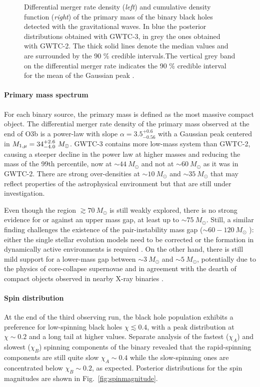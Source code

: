 \documentclass[a4paper,titlepage]{book}     	%
\newcommand{\sun}{\ensuremath{_\odot}}
\newcommand{\msun}{\ensuremath{M\sun}}
\begin{document}
\begin{figure}
\begin{minipage}{.39\textwidth}
	\end{minipage}
	\caption{Differential merger rate density  (\emph{left}) and cumulative density function (\emph{right}) of the primary mass of the binary black holes detected with the gravitational waves. In blue the posterior distributions obtained with GWTC-3, in grey the ones obtained with GWTC-2. The thick solid lines denote the median values and are surrounded by the 90 \% credible intervals.The vertical grey band on the differential merger rate indicates the 90 \% credible interval for the mean of the Gaussian peak \cite{GWTC-3_interpretation}.}\label{fig:primarymassspectrum}
\end{figure}


\paragraph{Primary mass spectrum}
For each binary source, the primary mass is defined as the most massive compact object. The differential merger rate density of the primary mass observed at the end of O3b is a power-law with slope $\alpha = 3.5_{-0.56}^{+0.6}$ with a Gaussian peak centered in $M_{\rm 1,\mu} = 34_{-4.0}^{+2.6}~ \msun$. GWTC-3 contains more low-mass system than GWTC-2, causing a steeper decline in the power law at higher masses and reducing the mass of the 99th percentile, now at $\sim 44~\msun$ and not at $\sim 60~\msun$ as it was in GWTC-2. There are strong over-densities at $\sim 10~\msun$ and $\sim 35~\msun$ that may reflect properties of the astrophysical environment but that are still under investigation.

Even though the region $\gtrsim 70~\msun$ is still weakly explored, there is no strong evidence for or against an upper mass gap, at least up to $\sim 75~\msun$. Still, a similar finding challenges the existence of the pair-instability mass gap ($\sim 60 - 120~\msun$ \cite{spera2017_pisnSNe}): either the single stellar evolution models need to be corrected \cite{MassGapStellarEvo_Costa2021} or the formation in dynamically active environments is required \cite{Rastello2021_dynamics}. On the other hand, there is still mild support for a lower-mass gap between $\sim 3~\msun$ and $\sim 5~\msun$, potentially due to the physics of core-collapse supernovae and in agreement with the dearth of compact objects observed in nearby X-ray binaries \cite{massgapreal_ozel2010}.




\paragraph{Spin distribution}
At the end of the third observing run, the black hole population exhibits a preference for low-spinning black holes $\chi \lesssim 0.4$, with a peak distribution at $\chi \sim 0.2$ and a long tail at higher values. Separate analysis of the fastest ($\chi_A$) and slowest ($\chi_B$) spinning components of the binary revealed that the rapid-spinning components are still quite slow $\chi_A \sim 0.4$ while the slow-spinning ones are concentrated below $\chi_B \sim 0.2$, as expected. Posterior distributions for the spin magnitudes are shown in Fig.\ \ref{fig:spinmagnitude}.
\end{document}
